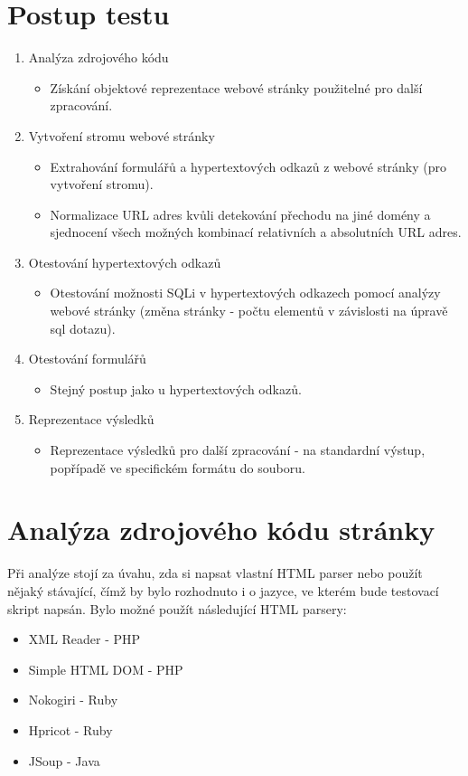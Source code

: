 \documentclass[12pt, a4paper]{report}
\begin{document}
\section{Postup testu}
\begin{enumerate}
\item Analýza zdrojového kódu 
\begin{itemize}
\item Získání objektové reprezentace webové stránky použitelné pro další zpracování.
\end{itemize}
\item Vytvoření stromu webové stránky
\begin{itemize}
\item Extrahování formulářů a hypertextových odkazů z webové stránky (pro vytvoření stromu).
\item Normalizace URL adres kvůli detekování přechodu na jiné domény a sjednocení všech možných kombinací relativních a absolutních URL adres.
\end{itemize}
\item Otestování hypertextových odkazů
\begin{itemize}
\item Otestování možnosti SQLi v hypertextových odkazech pomocí analýzy webové stránky (změna stránky - počtu elementů v závislosti na úpravě sql dotazu).
\end{itemize}
\item Otestování formulářů
\begin{itemize}
\item Stejný postup jako u hypertextových odkazů.
\end{itemize}
\item Reprezentace výsledků
\begin{itemize}
\item Reprezentace výsledků pro další zpracování - na standardní výstup, popřípadě ve specifickém formátu do souboru.
\end{itemize}
\end{enumerate}

\section{Analýza zdrojového kódu stránky}
Při analýze stojí za úvahu, zda si napsat vlastní HTML parser nebo použít nějaký stávající, čímž by bylo rozhodnuto i o jazyce, ve kterém bude testovací skript napsán. Bylo možné použít  následující HTML parsery:
\begin{itemize}
\item XML Reader - PHP
\item Simple HTML DOM - PHP
\item Nokogiri - Ruby
\item Hpricot - Ruby
\item JSoup - Java
\end{itemize}
\end{document}
